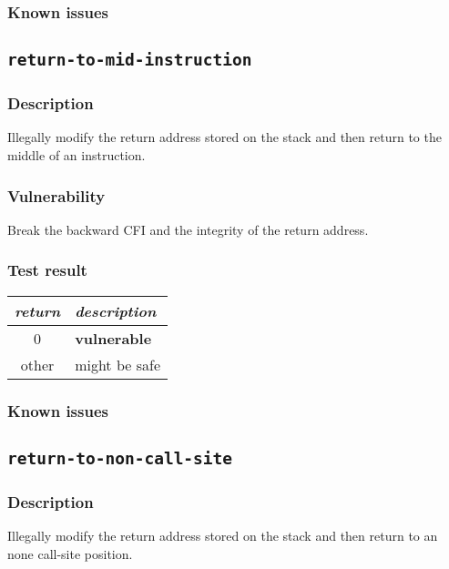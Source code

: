 \documentclass[a4paper]{book}
\begin{document}
\subsubsection{Known issues}

\newpage
\subsection{\texttt{return-to-mid-instruction}}\label{test-return-to-mid-instruction}

\subsubsection{Description}
Illegally modify the return address stored on the stack and then return to the middle of an instruction.

\subsubsection{Vulnerability}
Break the backward CFI and the integrity of the return address.

\subsubsection{Test result}
\begin{tabular}{cl}
  \toprule
  \emph{return}  & \emph{description} \\
  \midrule
  0              & \textbf{vulnerable} \\
  other          & might be safe \\
  \bottomrule
\end{tabular}
  
\subsubsection{Known issues}

\newpage
\subsection{\texttt{return-to-non-call-site}}\label{test-return-to-non-call-site}

\subsubsection{Description}
Illegally modify the return address stored on the stack and then return to an none call-site position.
\end{document}

